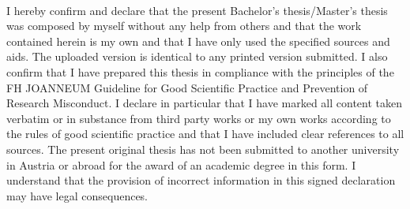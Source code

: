 %

\emptydoublepage \thispagestyle{empty} \vspace*{1cm}

{\hfill\fontfamily{\sfdefault}\bfseries\fontsize{16}{16}\selectfont{Obligatory declaration}}\vspace*{1cm}\\
%
I hereby confirm and declare that the present Bachelor's thesis/Master's thesis was composed by myself without any help from others and that the work contained herein is my own and that I have only used the specified sources and aids. The uploaded version is identical to any printed version submitted.\p
I also confirm that I have prepared this thesis in compliance with the principles of the FH JOANNEUM Guideline for Good Scientific Practice and Prevention of Research Misconduct.\p
I declare in particular that I have marked all content taken verbatim or in substance from third party works or my own works according to the rules of good scientific practice and that I have included clear references to all sources.\p
The present original thesis has not been submitted to another university in Austria or abroad for the award of an academic degree in this form.\p
I understand that the provision of incorrect information in this signed declaration may have legal consequences.
%
%
